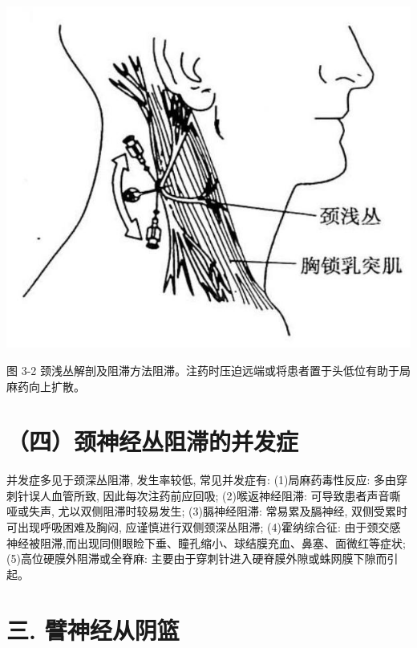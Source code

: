\documentclass[10pt]{article}
\begin{document}
\begin{center}
\includegraphics[max width=\textwidth]{2024_07_09_002a177993bd97d1d6d7g-052}
\end{center}

图 3-2 颈浅丛解剖及阻滞方法阻滞。注药时压迫远端或将患者置于头低位有助于局麻药向上扩散。

\section*{（四）颈神经丛阻滞的并发症}
并发症多见于颈深丛阻滞, 发生率较低, 常见并发症有: (1)局麻药毒性反应: 多由穿刺针误人血管所致, 因此每次注药前应回吸; (2)喉返神经阻滞: 可导致患者声音嘶哑或失声, 尤以双侧阻滞时较易发生; (3)膈神经阻滞: 常易累及膈神经, 双侧受累时可出现呼吸困难及胸闷, 应谨慎进行双侧颈深丛阻滞; (4)霍纳综合征: 由于颈交感神经被阻滞,而出现同侧眼睑下垂、瞳孔缩小、球结膜充血、鼻塞、面微红等症状; (5)高位硬膜外阻滞或全脊麻: 主要由于穿刺针进入硬脊膜外隙或蛛网膜下隙而引起。

\section*{三. 譬神经从阴篮}
\end{document}
